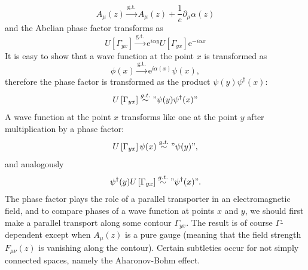 \begin{equation}
  A_\mu(z)\xrightarrow{\text{g.t.}} A_\mu(z)+ \frac{1}{e}\partial_\mu\alpha(z)
\end{equation}
and the Abelian phase factor transforms as 
\begin{equation}
  U\left[\Gamma_{yx}\right]\xrightarrow{\text{g.t.}}
  \mathrm{e}^{i\alpha{y}}  U\left[\Gamma_{yx}\right]
  \mathrm{e}^{-i\alpha{x}}
\end{equation}
It is easy to show that a wave function at the point $x$ is transformed as
\begin{equation}
  \phi(x)\xrightarrow{\text{g.t.}}\mathrm{e}^{i\alpha(x)}\psi(x),
\end{equation}
therefore the phase factor is transformed as the product
$\psi(y)\psi^\dagger(x)$:
\begin{equation}
  U\left[\Gamma_{yx}\right]\stackrel{g.t.}{\sim} "\psi(y)\psi^\dagger(x)"
\end{equation}
  A wave function at the point $x$ transforms like one at the point $y$ after
  multiplication by a phase factor:
\begin{equation}
    U\left[\Gamma_{yx}\right]\psi(x)\stackrel{g.t.}{\sim} "\psi(y)",
\end{equation}
and analogously
\begin{equation}
  \psi^\dagger(y) U\left[\Gamma_{yx}\right] \stackrel{g.t.}{\sim}
  "\psi^\dagger(x)".
\end{equation}
The phase factor plays the role of a parallel transporter in an electromagnetic
field, and to compare phases of a wave function at points $x$ and $y$, we
should first make a parallel transport along some contour $\Gamma_{yx}$. The
result is of course $\Gamma$-dependent except when $A_\mu(z)$ is a pure gauge
(meaning that the field strength $F_{\mu\nu}(z)$ is vanishing along the
contour). Certain subtleties occur for not simply connected spaces, namely the
Aharonov-Bohm effect. 

